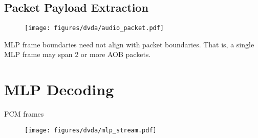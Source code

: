 \clearpage

\subsection{Packet Payload Extraction}

\begin{figure}[h]
  \texttt{[image: figures/dvda/audio\_packet.pdf]}
\end{figure}
\par
\noindent
MLP frame boundaries need not align with packet boundaries.
That is, a single MLP frame may span 2 or more AOB packets.

\clearpage

\section{MLP Decoding}
{
\Return PCM frames\;
\EALGORITHM
}

\begin{figure}[h]
  \texttt{[image: figures/dvda/mlp\_stream.pdf]}
\end{figure}


